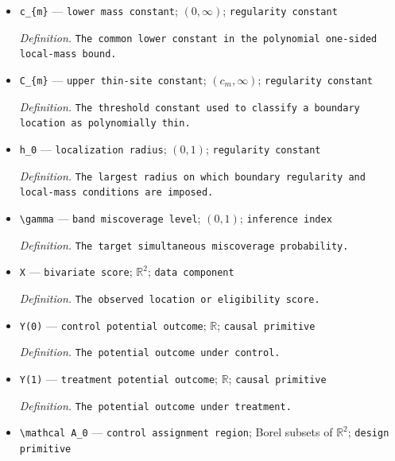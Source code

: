 \documentclass{article}
\begin{document}
\begin{itemize}
  \par\smallskip\noindent\emph{Definition.} \texttt{A fixed known conditional sub-\allowbreak{}Gaussian proxy for the observed regression residual;\allowbreak{} in the explicit Gaussian witness submodels it is also the noise standard deviation.}
  \item \texttt{c\_\allowbreak{}\{m\}\allowbreak{}} --- \texttt{lower mass constant}; \((0,\infty)\); \texttt{regularity constant}
  \par\smallskip\noindent\emph{Definition.} \texttt{The common lower constant in the polynomial one-\allowbreak{}sided local-\allowbreak{}mass bound.}
  \item \texttt{C\_\allowbreak{}\{m\}\allowbreak{}} --- \texttt{upper thin-\allowbreak{}site constant}; \((c_{m},\infty)\); \texttt{regularity constant}
  \par\smallskip\noindent\emph{Definition.} \texttt{The threshold constant used to classify a boundary location as polynomially thin.}
  \item \texttt{h\_\allowbreak{}0} --- \texttt{localization radius}; \((0,1)\); \texttt{regularity constant}
  \par\smallskip\noindent\emph{Definition.} \texttt{The largest radius on which boundary regularity and local-\allowbreak{}mass conditions are imposed.}
  \item \texttt{\textbackslash{}\allowbreak{}gamma} --- \texttt{band miscoverage level}; \((0,1)\); \texttt{inference index}
  \par\smallskip\noindent\emph{Definition.} \texttt{The target simultaneous miscoverage probability.}
  \item \texttt{X} --- \texttt{bivariate score}; \(\mathbb R^2\); \texttt{data component}
  \par\smallskip\noindent\emph{Definition.} \texttt{The observed location or eligibility score.}
  \item \texttt{Y(0)} --- \texttt{control potential outcome}; \(\mathbb R\); \texttt{causal primitive}
  \par\smallskip\noindent\emph{Definition.} \texttt{The potential outcome under control.}
  \item \texttt{Y(1)} --- \texttt{treatment potential outcome}; \(\mathbb R\); \texttt{causal primitive}
  \par\smallskip\noindent\emph{Definition.} \texttt{The potential outcome under treatment.}
  \item \texttt{\textbackslash{}\allowbreak{}mathcal A\_\allowbreak{}0} --- \texttt{control assignment region}; Borel subsets of \(\mathbb R^2\); \texttt{design primitive}

\end{itemize}
\end{document}
